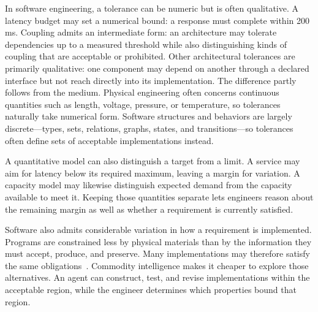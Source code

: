 In software engineering, a tolerance can be numeric but is often qualitative. A latency budget may set a numerical bound: a response must complete within 200 ms. Coupling admits an intermediate form: an architecture may tolerate dependencies up to a measured threshold while also distinguishing kinds of coupling that are acceptable or prohibited. Other architectural tolerances are primarily qualitative: one component may depend on another through a declared interface but not reach directly into its implementation. The difference partly follows from the medium. Physical engineering often concerns continuous quantities such as length, voltage, pressure, or temperature, so tolerances naturally take numerical form. Software structures and behaviors are largely discrete---types, sets, relations, graphs, states, and transitions---so tolerances often define sets of acceptable implementations instead.


A quantitative model can also distinguish a target from a limit. A service may aim for latency below its required maximum, leaving a margin for variation. A capacity model may likewise distinguish expected demand from the capacity available to meet it. Keeping those quantities separate lets engineers reason about the remaining margin as well as whether a requirement is currently satisfied.


Software also admits considerable variation in how a requirement is implemented. Programs are constrained less by physical materials than by the information they must accept, produce, and preserve. Many implementations may therefore satisfy the same obligations~\citep{brooks1987}. Commodity intelligence makes it cheaper to explore those alternatives. An agent can construct, test, and revise implementations within the acceptable region, while the engineer determines which properties bound that region.


